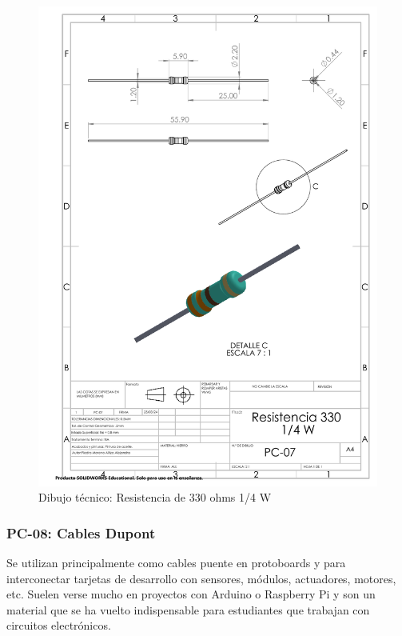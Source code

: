 \begin{figure}[H]
    \centering
    \includegraphics[trim = {7mm 1mm 1mm 1mm},clip,scale=0.4]{22/Img/resistenciaDibujo.PDF}
    \caption{Dibujo técnico: Resistencia de 330 ohms 1/4 W}
    \label{fig:enter-label7}
\end{figure}


\subsubsection{PC-08: Cables Dupont }

Se utilizan principalmente como cables puente en protoboards y para interconectar tarjetas de desarrollo con sensores, módulos, actuadores, motores, etc. Suelen verse mucho en proyectos con Arduino o Raspberry Pi y son un material que se ha vuelto indispensable para estudiantes que trabajan con circuitos electrónicos. 


